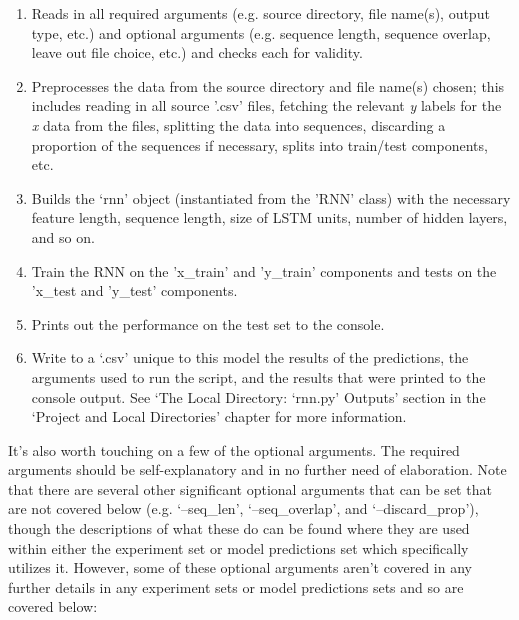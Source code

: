 \documentclass[12pt,twoside]{report}
\begin{document}
\begin{enumerate}
	\item Reads in all required arguments (e.g. source directory, file name(s), output type, etc.) and optional arguments (e.g. sequence length, sequence overlap, leave out file choice, etc.) and checks each for validity.
	\item Preprocesses the data from the source directory and file name(s) chosen; this includes reading in all source '.csv' files, fetching the relevant \textit{y} labels for the \textit{x} data from the files, splitting the data into sequences, discarding a proportion of the sequences if necessary, splits into train/test components, etc.
	\item Builds the ‘rnn’ object (instantiated from the 'RNN' class) with the necessary feature length, sequence length, size of LSTM units, number of hidden layers, and so on.
	\item Train the RNN on the 'x\_train' and 'y\_train' components and tests on the 'x\_test and 'y\_test' components.
	\item Prints out the performance on the test set to the console.
	\item Write to a ‘.csv’ unique to this model the results of the predictions, the arguments used to run the script, and the results that were printed to the console output. See ‘The Local Directory: ‘rnn.py’ Outputs’ section in the ‘Project and Local Directories’ chapter for more information.
\end{enumerate}

\quad It's also worth touching on a few of the optional arguments. The required arguments should be self-explanatory and in no further need of elaboration. Note that there are several other significant optional arguments that can be set that are not covered below (e.g. ‘--seq\_len’, ‘--seq\_overlap', and ‘--discard\_prop’), though the descriptions of what these do can be found where they are used within either the experiment set or model predictions set which specifically utilizes it. However, some of these optional arguments aren’t covered in any further details in any experiment sets or model predictions sets and so are covered below:
\end{document}

